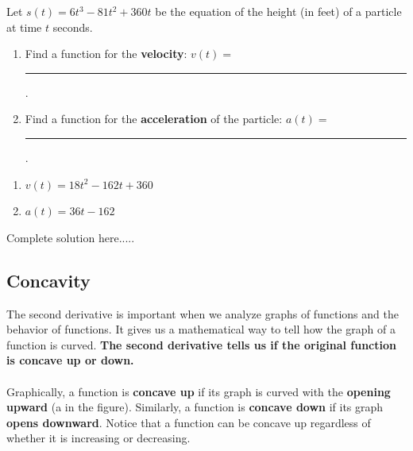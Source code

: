 \begin{example}\label{acceleration}
Let $s(t)=6t^3-81t^2+360t$ be the equation of the height (in feet) of a particle at time $t$ seconds. 
\renewcommand{\labelenumi}{(\alph{enumi})}
\begin{enumerate}[leftmargin=*]
    \item Find a function for the \textbf{velocity}: $v(t)=$\rule{3cm}{0.25mm}.\vspace{0.8in}
    \item Find a function for the \textbf{acceleration} of the particle: $a(t)=$\rule{3cm}{0.25mm}.\vspace{0.6in}
    
\end{enumerate}
    \begin{sol}
     \renewcommand{\labelenumi}{(\alph{enumi})}
     \begin{enumerate}
         \item $v(t)=18t^2-162t+360$
         \item $a(t)=36t-162$
     \end{enumerate}
    \end{sol}
    \begin{solL}
        Complete solution here.....
    \end{solL}       
        
\end{example}


\subsection*{Concavity}

The second derivative is important when we analyze graphs of functions and the behavior of functions. It gives us a mathematical way to tell how the graph of a function is curved. \textbf{The second derivative tells us if the original function is concave up or down.}\\\\
Graphically, a function is \textbf{concave up} if its graph is curved with the \textbf{opening upward} (a in the figure). Similarly, a function is \textbf{concave down} if its graph \textbf{opens downward}. Notice that a function can be concave up regardless of whether it is increasing or decreasing.
\newpage

